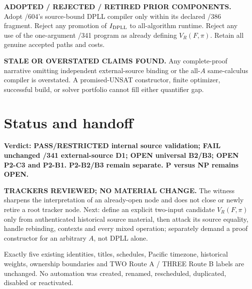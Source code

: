 \documentclass[11pt]{article}
\begin{document}
\textbf{ADOPTED / REJECTED / RETIRED PRIOR COMPONENTS.} Adopt /604's source-bound DPLL compiler only within its declared /386 fragment. Reject any promotion of $I_{\rm DPLL}$ to all-algorithm runtime. Reject any use of the one-argument /341 program as already defining $V_R(F,\pi)$. Retain all genuine accepted paths and costs.

\textbf{STALE OR OVERSTATED CLAIMS FOUND.} Any complete-proof narrative omitting independent external-source binding or the all-$A$ same-calculus compiler is overstated. A promised-UNSAT constructor, finite optimizer, successful build, or solver portfolio cannot fill either quantifier gap.

\section*{Status and handoff}
\textbf{Verdict: PASS/RESTRICTED internal source validation; FAIL unchanged /341 external-source D1; OPEN universal B2/B3; OPEN P2-C3 and P2-B1. P2-B2/B3 remain separate. P versus NP remains OPEN.}

\textbf{TRACKERS REVIEWED; NO MATERIAL CHANGE.} The witness sharpens the interpretation of an already-open node and does not close or newly retire a root tracker node. Next: define an explicit two-input candidate $V_R(F,\pi)$ only from authenticated historical source material, then attack its source equality, handle rebinding, contexts and every mixed operation; separately demand a proof constructor for an arbitrary $A$, not DPLL alone.

Exactly five existing identities, titles, schedules, Pacific timezone, historical weights, ownership boundaries and TWO Route A / THREE Route B labels are unchanged. No automation was created, renamed, rescheduled, duplicated, disabled or reactivated.
\end{document}
